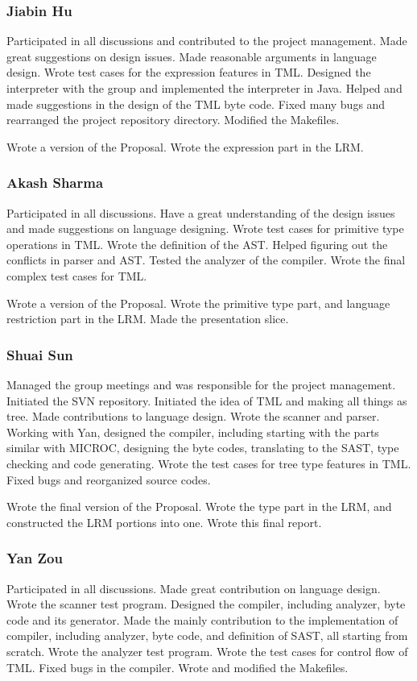 \documentclass[12pt,psfig,a4]{article}
\begin{document}
\subsubsection{Jiabin Hu}
Participated in all discussions and contributed to the project management. Made great suggestions on design issues. Made reasonable arguments in language design. Wrote test cases for the expression features in TML. Designed the interpreter with the group and implemented the interpreter in Java. Helped and made suggestions in the design of the TML byte code. Fixed many bugs and rearranged the project repository directory. Modified the Makefiles. 

Wrote a version of the Proposal. Wrote the expression part in the LRM. 

\subsubsection{Akash Sharma}
Participated in all discussions. Have a great understanding of the design issues and made suggestions on language designing. Wrote test cases for primitive type operations in TML. Wrote the definition of the AST. Helped figuring out the conflicts in parser and AST. Tested the analyzer of the compiler. Wrote the final complex test cases for TML.

Wrote a version of the Proposal. Wrote the primitive type part, and language restriction part in the LRM. Made the presentation slice.


\subsubsection{Shuai Sun}
Managed the group meetings and was responsible for the project management. Initiated the SVN repository. Initiated the idea of TML and making all things as tree. Made contributions to language design. Wrote the scanner and parser. Working with Yan, designed the compiler, including starting with the parts similar with MICROC, designing the byte codes, translating to the SAST, type checking and code generating. Wrote the test cases for tree type features in TML. Fixed bugs and reorganized source codes.

Wrote the final version of the Proposal. Wrote the type part in the LRM, and constructed the LRM portions into one. Wrote this final report.

\subsubsection{Yan Zou}
Participated in all discussions. Made great contribution on language design. Wrote the scanner test program. Designed the compiler, including analyzer, byte code and its generator. Made the mainly contribution to the implementation of compiler, including analyzer, byte code, and definition of SAST, all starting from scratch. Wrote the analyzer test program. Wrote the test cases for control flow of TML. Fixed bugs in the compiler. Wrote and modified the Makefiles.
\end{document}
